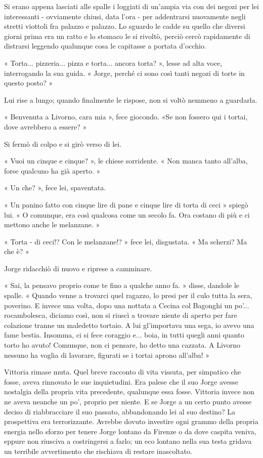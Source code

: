 Si erano appena lasciati alle spalle i loggiati di un'ampia via con dei negozi per lei interessanti - ovviamente chiusi, data l'ora - per addentrarsi nuovamente negli stretti viottoli fra palazzo e palazzo. Lo sguardo le cadde su quello che diversi giorni prima era un ratto e lo stomaco le si rivoltò, perciò cercò rapidamente di distrarsi leggendo qualunque cosa le capitasse a portata d'occhio.

« Torta... pizzeria... pizza e torta... ancora torta? », lesse ad alta voce, interrogando la sua guida. « Jorge, perché ci sono così tanti negozi di torte in questo posto? »

Lui rise a lungo; quando finalmente le rispose, non si voltò nemmeno a guardarla.

« Benvenuta a Livorno, cara mia », fece giocondo. «Se non fossero qui i tortai, dove avrebbero a essere? »

Si fermò di colpo e si girò verso di lei.

« Vuoi un cinque e cinque? », le chiese sorridente. « Non manca tanto all'alba, forse qualcuno ha già aperto. »

« Un che? », fece lei, spaventata.

« Un panino fatto con cinque lire di pane e cinque lire di torta di ceci » spiegò lui. « O comunque, era così qualcosa come un secolo fa. Ora costano di più e ci mettono anche le melanzane. »

« Torta - di ceci!? Con le melanzane!? » fece lei, disgustata. « Ma scherzi? Ma che è? »

Jorge ridacchiò di nuovo e riprese a camminare.

« Sai, la pensavo proprio come te fino a qualche anno fa. » disse, dandole le spalle. « Quando venne a trovarci quel ragazzo, lo presi per il culo tutta la sera, poverino. E invece una volta, dopo una nottata a Cecina col Bagonghi un po'... rocambolesca, diciamo così, non si riuscì a trovare niente di aperto per fare colazione tranne un maledetto tortaio. A lui gl'importava una sega, io avevo una fame bestia. Insomma, ci si fece coraggio e... boia, in tutti quegli anni quanto torto ho avuto! Comunque, non ci pensare, ho detto una cazzata. A Livorno nessuno ha voglia di lavorare, figurati se i tortai aprono all'alba! »

Vittoria rimase muta. Quel breve racconto di vita vissuta, per simpatico che fosse, aveva rinnovato le sue inquietudini. Era palese che il suo Jorge avesse nostalgia della propria vita precedente, qualunque essa fosse. Vittoria invece non ne aveva neanche un po', proprio per niente. E se Jorge a un certo punto avesse deciso di riabbracciare il suo passato, abbandonando lei al suo destino? La prospettiva era terrorizzante. Avrebbe dovuto investire ogni grammo della propria energia nello sforzo per tenere Jorge lontano da Firenze o da dove caspita veniva, eppure non riusciva a costringersi a farlo; un eco lontano nella sua testa gridava un terribile avvertimento che rischiava di restare inascoltato.

